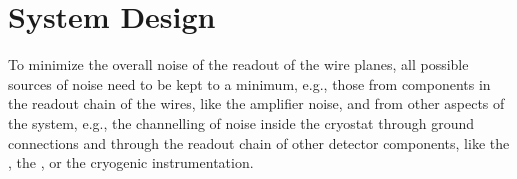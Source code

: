 \section{System Design}
\label{sec:fdsp-tpcelec-design}

\begin{comment}
In order to keep the overall noise of the readout of the \dword{apa}
wires' planes, all possible sources of noise need to be kept to a
minimum. This requires not only minimizing the noise sources in each
of the component of the readout chain of the \dword{apa} wires, like
the \dword{fe} amplifier noise. It also requires that all system aspects
are taken into account, including avoiding channelling noise inside
the cryostat through ground connections and through the readout
chain of other detector components, like the \dword{pds}, the \dword{hvs},
or the cryogenic instrumentation. In this Section we describe,the overall
system design of the \dword{ce}, starting in
\ref{sec:fdsp-tpcelec-design-grounding} with a description of the
grounding and shielding scheme adopted in the \dword{dune} \dword{spmod}
to minimize the overall noise in the detector, followed in
\ref{sec:fdsp-tpcelec-design-bias} by a discussion of the bias
voltage distribution system. Later, we describe in 
\ref{sec:fdsp-tpcelec-design-femb} the \dwords{femb}, including
the design of the \dwords{asic} that are being considered for
use in \dword{dune}. In~\ref{sec:fdsp-tpcelec-design-infrastructure}
we discuss the infrastructure for the \dword{ce} inside the cryostat,
that includes the cold boxes that shield the \dwords{femb}, the
cold cables, and the cables trays. Then in
\ref{sec:fdsp-tpcelec-design-ft}-\ref{sec:fdsp-tpcelec-design-timing} we discuss 
the infrastructure on the top of the cryostat, including the
feedthroughs, the \dwords{wiec}, the timing distribution and
synchronization system, and the services that provide the low
voltage power and the bias voltage to the \dword{ce}. Finally,
we conclude in~\ref{sec:fdsp-tpcelec-overview-remaining}
with a discussion of the design maturity and of
the remaining prototype activities that are required prior to
the beginning of he detector construction. Other aspects of
the system design, pertaining to the grounding of other 
detector components, are discussed in Section~\ref{sec:fdsp-tpcelec-interfaces}.
\end{comment}
To minimize the overall noise of the readout of the 
wire planes, all possible sources of noise need to be kept to a
minimum, e.g., those from  components in the readout chain of the  wires, like
the  amplifier noise, and from other aspects of the system, e.g., the  channelling of noise inside
the cryostat through ground connections and through the readout
chain of other detector components, like the , the ,
or the cryogenic instrumentation. 

